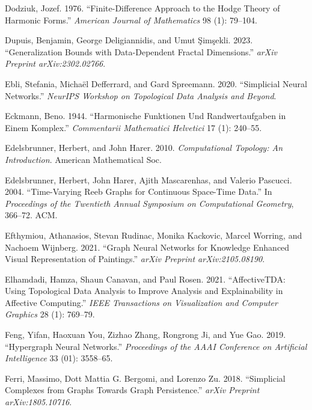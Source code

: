 \documentclass[
  12pt,
]{krantz}
\newlength{\cslhangindent}
\newenvironment{CSLReferences}[2] %
 {\begin{list}{}{%
  \setlength{\itemindent}{0pt}
  \setlength{\leftmargin}{0pt}
  \setlength{\parsep}{0pt}
  \ifodd #1
   \setlength{\leftmargin}{\cslhangindent}
   \setlength{\itemindent}{-1\cslhangindent}
  \fi
  \setlength{\itemsep}{#2\baselineskip}}}
 {\end{list}}
\begin{document}
\begin{CSLReferences}{1}{0}
Dodziuk, Jozef. 1976. {``Finite-Difference Approach to the {H}odge
Theory of Harmonic Forms.''} \emph{American Journal of Mathematics} 98
(1): 79--104.

Dupuis, Benjamin, George Deligiannidis, and Umut Şimşekli. 2023.
{``Generalization Bounds with Data-Dependent Fractal Dimensions.''}
\emph{arXiv Preprint arXiv:2302.02766}.

Ebli, Stefania, Michaël Defferrard, and Gard Spreemann. 2020.
{``Simplicial Neural Networks.''} \emph{NeurIPS Workshop on Topological
Data Analysis and Beyond}.

Eckmann, Beno. 1944. {``Harmonische Funktionen Und Randwertaufgaben in
Einem Komplex.''} \emph{Commentarii Mathematici Helvetici} 17 (1):
240--55.

Edelsbrunner, Herbert, and John Harer. 2010. \emph{Computational
Topology: An Introduction}. American Mathematical Soc.

Edelsbrunner, Herbert, John Harer, Ajith Mascarenhas, and Valerio
Pascucci. 2004. {``Time-Varying {R}eeb Graphs for Continuous Space-Time
Data.''} In \emph{Proceedings of the Twentieth Annual Symposium on
Computational Geometry}, 366--72. ACM.

Efthymiou, Athanasios, Stevan Rudinac, Monika Kackovic, Marcel Worring,
and Nachoem Wijnberg. 2021. {``Graph Neural Networks for Knowledge
Enhanced Visual Representation of Paintings.''} \emph{arXiv Preprint
arXiv:2105.08190}.

Elhamdadi, Hamza, Shaun Canavan, and Paul Rosen. 2021.
{``Affective{TDA}: Using Topological Data Analysis to Improve Analysis
and Explainability in Affective Computing.''} \emph{IEEE Transactions on
Visualization and Computer Graphics} 28 (1): 769--79.

Feng, Yifan, Haoxuan You, Zizhao Zhang, Rongrong Ji, and Yue Gao. 2019.
{``Hypergraph Neural Networks.''} \emph{Proceedings of the AAAI
Conference on Artificial Intelligence} 33 (01): 3558--65.

Ferri, Massimo, Dott Mattia G. Bergomi, and Lorenzo Zu. 2018.
{``Simplicial Complexes from Graphs Towards Graph Persistence.''}
\emph{arXiv Preprint arXiv:1805.10716}.


\end{CSLReferences}
\end{document}

